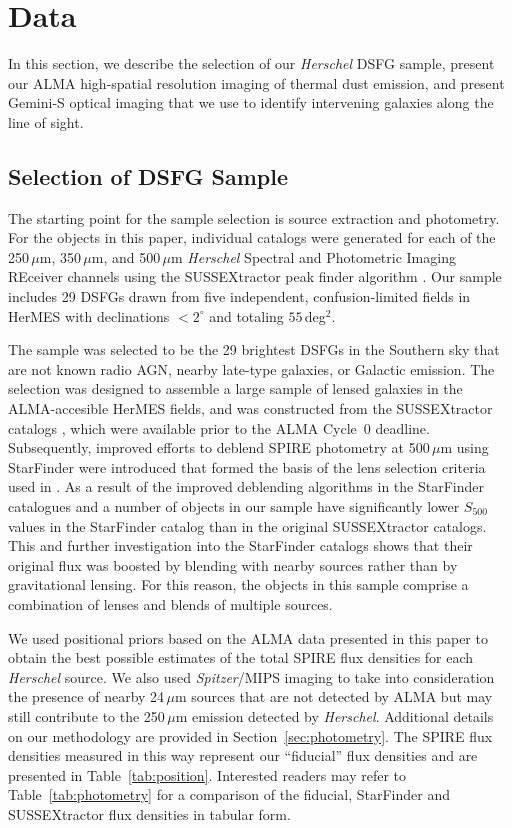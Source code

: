 \documentclass[iop]{emulateapj}
\begin{document}
\section{Data}\label{sec:obs}

In this section, we describe the selection of our {\it Herschel} DSFG sample,
present our ALMA high-spatial resolution imaging of thermal dust emission, and
present Gemini-S optical imaging that we use to identify intervening galaxies
along the line of sight.  

\subsection{Selection of DSFG Sample}\label{sec:select}

The starting point for the sample selection is source extraction and
photometry.  For the objects in this paper, individual catalogs were generated
for each of the 250$\, \mu$m, 350$\,\mu$m, and 500$\,\mu$m {\it Herschel}
Spectral and Photometric Imaging REceiver \citep[SPIRE;][]{Griffin:2010lr}
channels using the SUSSEXtractor peak finder algorithm \citep{Savage:2007sf}.
Our sample includes 29 DSFGs drawn from five independent, confusion-limited
fields in HerMES with declinations $< 2 ^\circ$ and totaling $55\,$deg$^2$.

The sample was selected to be the 29 brightest DSFGs in the Southern sky that
are not known radio AGN, nearby late-type galaxies, or Galactic emission. The
selection was designed to assemble a large sample of lensed galaxies in the
ALMA-accesible HerMES fields, and was constructed from the SUSSEXtractor
catalogs \citep{Smith:2012uq}, which were available prior to the ALMA Cycle~0
deadline.  Subsequently, improved efforts to deblend SPIRE photometry at
500$\,\mu$m using StarFinder \citep{Wang:2014lr} were introduced that formed
the basis of the lens selection criteria used in \citet{Wardlow:2013lr}.  As a
result of the improved deblending algorithms in the StarFinder catalogues and
\citet{Wardlow:2013lr} a number of objects in our sample have significantly
lower $S_{500}$ values in the StarFinder catalog than in the original
SUSSEXtractor catalogs.  This and further investigation into the StarFinder
catalogs shows that their original flux was boosted by blending with nearby
sources rather than by gravitational lensing.  For this reason, the objects in
this sample comprise a combination of lenses and blends of multiple sources.

We used positional priors based on the ALMA data presented in this paper to
obtain the best possible estimates of the total SPIRE flux densities for each
{\it Herschel} source.  We also used {\it Spitzer}/MIPS
\citep{2004ApJS..154...25R} imaging to take into consideration the presence of
nearby 24$\,\mu$m sources that are not detected by ALMA but may still
contribute to the 250$\,\mu$m emission detected by {\it Herschel}.  Additional
details on our methodology are provided in Section~\ref{sec:photometry}.  The
SPIRE flux densities measured in this way represent our ``fiducial'' flux
densities and are presented in Table~\ref{tab:position}.  Interested readers
may refer to Table~\ref{tab:photometry} for a comparison of the fiducial,
StarFinder and SUSSEXtractor flux densities in tabular form. 
\end{document}
